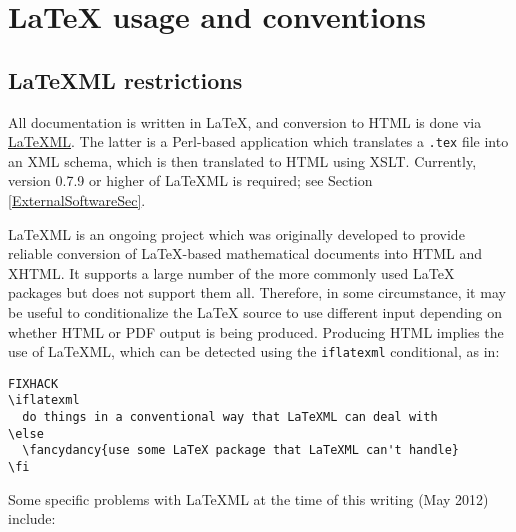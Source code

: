 \documentclass{article}
\begin{document}
\section{LaTeX usage and conventions}

\label{LatexUsage}

\subsection{LaTeXML restrictions}

All documentation is written in LaTeX, and conversion to HTML is done
via \href{http://dlmf.nist.gov/LaTeXML/}{LaTeXML}.  The latter is a
Perl-based application which translates a {\tt .tex} file into an XML
schema, which is then translated to HTML using XSLT. Currently,
version 0.7.9 or higher of LaTeXML is required; see 
Section \ref{ExternalSoftwareSec}.

LaTeXML is an ongoing project which was originally developed to
provide reliable conversion of LaTeX-based mathematical documents into
HTML and XHTML. It supports a large number of the more commonly used
LaTeX packages but does not support them all. Therefore, in some
circumstance, it may be useful to conditionalize the LaTeX source to
use different input depending on whether HTML or PDF output is being
produced. Producing HTML implies the use of LaTeXML, which can be
detected using the {\tt \BKS iflatexml} conditional, as in:

\begin{lstlisting}FIXHACK
\iflatexml
  do things in a conventional way that LaTeXML can deal with
\else
  \fancydancy{use some LaTeX package that LaTeXML can't handle}
\fi
\end{lstlisting}

Some specific problems with LaTeXML at the time of this writing
(May 2012) include:
\end{document}
